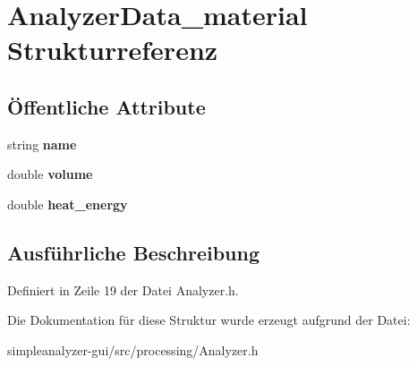 \hypertarget{structAnalyzerData__material}{\section{Analyzer\-Data\-\_\-material Strukturreferenz}
\label{structAnalyzerData__material}
}
\subsection*{Öffentliche Attribute}
\begin{DoxyCompactItemize}
\item 
\hypertarget{structAnalyzerData__material_afbc49171cd5315bdf38fd8e8454a0093}{string {\bfseries name}}\label{structAnalyzerData__material_afbc49171cd5315bdf38fd8e8454a0093}

\item 
\hypertarget{structAnalyzerData__material_ac0c4a748d346a87fa4fb0ebd2b6ad523}{double {\bfseries volume}}\label{structAnalyzerData__material_ac0c4a748d346a87fa4fb0ebd2b6ad523}

\item 
\hypertarget{structAnalyzerData__material_ab1c86b6ab06995abf02c3108386686f6}{double {\bfseries heat\-\_\-energy}}\label{structAnalyzerData__material_ab1c86b6ab06995abf02c3108386686f6}

\end{DoxyCompactItemize}


\subsection{Ausführliche Beschreibung}


Definiert in Zeile 19 der Datei Analyzer.\-h.



Die Dokumentation für diese Struktur wurde erzeugt aufgrund der Datei\-:\begin{DoxyCompactItemize}
\item 
simpleanalyzer-\/gui/src/processing/Analyzer.\-h\end{DoxyCompactItemize}
